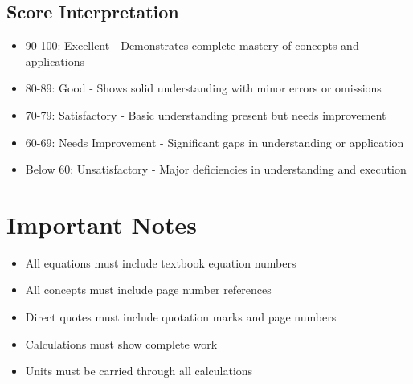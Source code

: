 \documentclass[12pt]{article}
\begin{document}
\subsection{Score Interpretation}
\begin{itemize}
\item 90-100: Excellent - Demonstrates complete mastery of concepts and applications
\item 80-89: Good - Shows solid understanding with minor errors or omissions
\item 70-79: Satisfactory - Basic understanding present but needs improvement
\item 60-69: Needs Improvement - Significant gaps in understanding or application
\item Below 60: Unsatisfactory - Major deficiencies in understanding and execution
\end{itemize}

\section*{Important Notes}
\begin{itemize}
\item All equations must include textbook equation numbers
\item All concepts must include page number references
\item Direct quotes must include quotation marks and page numbers
\item Calculations must show complete work
\item Units must be carried through all calculations
\end{itemize}
\end{document}
